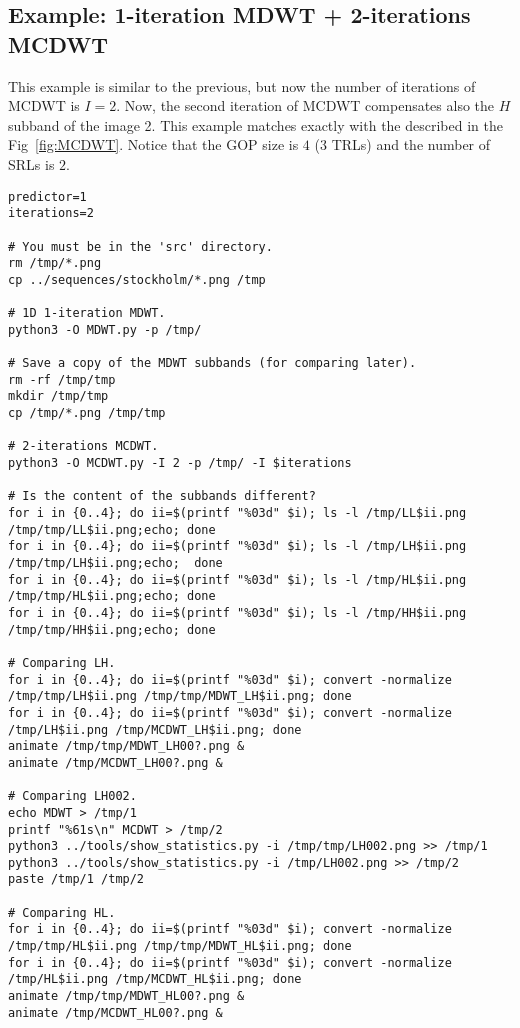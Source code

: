 \subsection*{Example: 1-iteration MDWT + 2-iterations MCDWT}
This example is similar to the previous, but now the number of
iterations of MCDWT is $I=2$. Now, the second iteration of MCDWT
compensates also the $H$ subband of the image 2. This example matches
exactly with the described in the Fig~\ref{fig:MCDWT}. Notice that the
GOP size is $4$ ($3$ TRLs) and the number of SRLs is $2$.

\begin{verbatim}
predictor=1
iterations=2

# You must be in the 'src' directory.
rm /tmp/*.png
cp ../sequences/stockholm/*.png /tmp

# 1D 1-iteration MDWT.
python3 -O MDWT.py -p /tmp/

# Save a copy of the MDWT subbands (for comparing later).
rm -rf /tmp/tmp
mkdir /tmp/tmp
cp /tmp/*.png /tmp/tmp

# 2-iterations MCDWT.
python3 -O MCDWT.py -I 2 -p /tmp/ -I $iterations

# Is the content of the subbands different?
for i in {0..4}; do ii=$(printf "%03d" $i); ls -l /tmp/LL$ii.png /tmp/tmp/LL$ii.png;echo; done
for i in {0..4}; do ii=$(printf "%03d" $i); ls -l /tmp/LH$ii.png /tmp/tmp/LH$ii.png;echo;  done
for i in {0..4}; do ii=$(printf "%03d" $i); ls -l /tmp/HL$ii.png /tmp/tmp/HL$ii.png;echo; done
for i in {0..4}; do ii=$(printf "%03d" $i); ls -l /tmp/HH$ii.png /tmp/tmp/HH$ii.png;echo; done

# Comparing LH.
for i in {0..4}; do ii=$(printf "%03d" $i); convert -normalize /tmp/tmp/LH$ii.png /tmp/tmp/MDWT_LH$ii.png; done
for i in {0..4}; do ii=$(printf "%03d" $i); convert -normalize /tmp/LH$ii.png /tmp/MCDWT_LH$ii.png; done
animate /tmp/tmp/MDWT_LH00?.png &
animate /tmp/MCDWT_LH00?.png &

# Comparing LH002.
echo MDWT > /tmp/1
printf "%61s\n" MCDWT > /tmp/2
python3 ../tools/show_statistics.py -i /tmp/tmp/LH002.png >> /tmp/1
python3 ../tools/show_statistics.py -i /tmp/LH002.png >> /tmp/2
paste /tmp/1 /tmp/2

# Comparing HL.
for i in {0..4}; do ii=$(printf "%03d" $i); convert -normalize /tmp/tmp/HL$ii.png /tmp/tmp/MDWT_HL$ii.png; done
for i in {0..4}; do ii=$(printf "%03d" $i); convert -normalize /tmp/HL$ii.png /tmp/MCDWT_HL$ii.png; done
animate /tmp/tmp/MDWT_HL00?.png &
animate /tmp/MCDWT_HL00?.png &


\end{verbatim}
